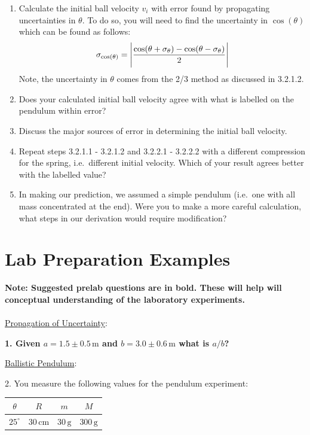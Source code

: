\begin{enumerate}
    \item Calculate the initial ball velocity $v_{i}$ with error found by propagating uncertainties in $\theta$. To do so, you will need to find the uncertainty in $\cos(\theta)$ which can be found as follows:
\begin{gather}
\sigma_{\cos(\theta)} = \Bigg{|}\frac{\cos(\theta + \sigma_\theta) - \cos(\theta - \sigma_\theta)}{2} \Bigg{|}
\end{gather}
Note, the uncertainty in $\theta$ comes from the 2/3 method as discussed in 3.2.1.2.
\item Does your calculated initial ball velocity agree with what is labelled on the pendulum within error?
\item Discuss the major sources of error in determining the initial ball velocity.
    \item Repeat steps 3.2.1.1 - 3.2.1.2 and 3.2.2.1 - 3.2.2.2 with a different compression for the spring, i.e.\ different initial velocity. Which of your result agrees better with the labelled value? %
    \item In making our prediction, we assumed a simple pendulum (i.e.\ one with all mass concentrated at the end).  Were you to make a more careful calculation, what steps in our derivation would require modification?
\end{enumerate}

\section{Lab Preparation Examples}
{\bf{Note: Suggested prelab questions are in bold. These will help will conceptual understanding of the laboratory experiments.}}
\\
\\
\noindent\underline{Propagation of Uncertainty}:\myskip

{\bf{1. Given $a = 1.5 \pm 0.5\, \textrm{m}$ and $b = 3.0 \pm 0.6\, \textrm{m}$ what is $a/b$?}}\myskip

\noindent\underline{Ballistic Pendulum}:\myskip

2. You measure the following values for the pendulum experiment:
\begin{table}[h]
  \centering
  \begin{tabular}{|c|c|c|c|}
    \hline
    $\theta$&$R$&$m$&$M$\\
    \hline
    $25^\circ$ & $30\,\mathrm{cm}$ & $30\,\textrm{g}$ & $300\,\textrm{g}$\\
    \hline
  \end{tabular}
\end{table}

